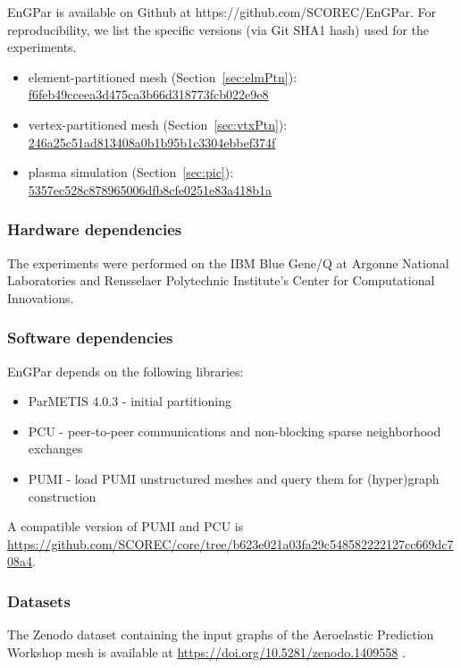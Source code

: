 EnGPar is available on Github at {https://github.com/SCOREC/EnGPar}.
For reproducibility, we list the specific versions (via Git SHA1 hash) used for
the experiments.  

\begin{itemize}
  \item element-partitioned mesh (Section~\ref{sec:elmPtn}):
    \url{f6feb49cceea3d475ca3b66d318773fcb022e9e8}
  \item vertex-partitioned mesh (Section~\ref{sec:vtxPtn}):
    \url{246a25c51ad813408a0b1b95b1c3304ebbef374f}
  \item plasma simulation (Section~\ref{sec:pic}): 
    \url{5357ec528c878965006dfb8cfe0251e83a418b1a}
\end{itemize}

\subsubsection{Hardware dependencies}

The experiments were performed on the IBM Blue Gene/Q at Argonne National
Laboratories and Rensselaer Polytechnic Institute's Center for Computational
Innovations.

\subsubsection{Software dependencies}

EnGPar depends on the following libraries:
\begin{itemize}
  \item ParMETIS 4.0.3 - initial partitioning
  \item PCU - peer-to-peer communications and non-blocking sparse neighborhood exchanges
  \item PUMI - load PUMI unstructured meshes and query them for (hyper)graph construction
\end{itemize}

A compatible version of PUMI and PCU is
\url{https://github.com/SCOREC/core/tree/b623e021a03fa29c548582222127cc669dc708a4}.

\subsubsection{Datasets}

The Zenodo dataset containing the input graphs of the Aeroelastic Prediction
Workshop mesh is available at \url{https://doi.org/10.5281/zenodo.1409558} .

